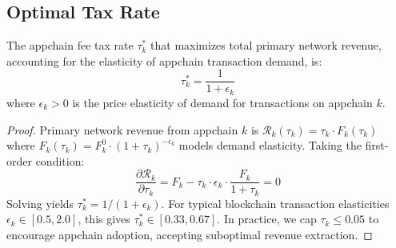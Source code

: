 \subsection{Optimal Tax Rate}

\begin{theorem}
The appchain fee tax rate $\tau_k^*$ that maximizes total primary network revenue, accounting for the elasticity of appchain transaction demand, is:
\begin{equation}
    \tau_k^* = \frac{1}{1 + \epsilon_k}
\end{equation}
where $\epsilon_k > 0$ is the price elasticity of demand for transactions on appchain $k$.
\end{theorem}

\begin{proof}
Primary network revenue from appchain $k$ is $\mathcal{R}_k(\tau_k) = \tau_k \cdot F_k(\tau_k)$ where $F_k(\tau_k) = F_k^0 \cdot (1 + \tau_k)^{-\epsilon_k}$ models demand elasticity. Taking the first-order condition:
\begin{equation}
    \frac{\partial \mathcal{R}_k}{\partial \tau_k} = F_k - \tau_k \cdot \epsilon_k \cdot \frac{F_k}{1 + \tau_k} = 0
\end{equation}
Solving yields $\tau_k^* = 1 / (1 + \epsilon_k)$. For typical blockchain transaction elasticities $\epsilon_k \in [0.5, 2.0]$, this gives $\tau_k^* \in [0.33, 0.67]$. In practice, we cap $\tau_k \leq 0.05$ to encourage appchain adoption, accepting suboptimal revenue extraction.
\end{proof}

